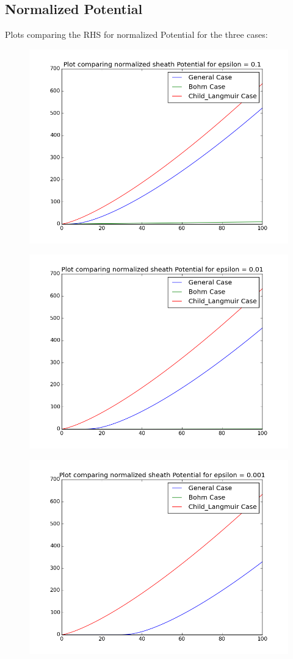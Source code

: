 \documentclass[11pt, a4paper]{article}
\begin{document}
\subsection{Normalized Potential}
Plots comparing the RHS for normalized Potential for the three cases:
\begin{figure}[H]
 \centering
 \includegraphics[width = \textwidth]{q3Veps1.png}
\end{figure}
\begin{figure}[H]
 \centering
 \includegraphics[width = \textwidth]{q3Veps2.png}
\end{figure}

\begin{figure}[H]
 \centering
 \includegraphics[width = \textwidth]{q3Veps3.png}
\end{figure}
\end{document}
